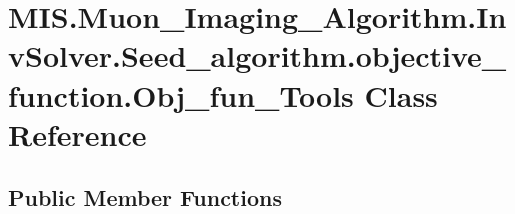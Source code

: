 \hypertarget{classMIS_1_1Muon__Imaging__Algorithm_1_1InvSolver_1_1Seed__algorithm_1_1objective__function_1_1Obj__fun__Tools}{}\section{M\+I\+S.\+Muon\+\_\+\+Imaging\+\_\+\+Algorithm.\+Inv\+Solver.\+Seed\+\_\+algorithm.\+objective\+\_\+function.\+Obj\+\_\+fun\+\_\+\+Tools Class Reference}
\label{classMIS_1_1Muon__Imaging__Algorithm_1_1InvSolver_1_1Seed__algorithm_1_1objective__function_1_1Obj__fun__Tools}
\subsection*{Public Member Functions}
